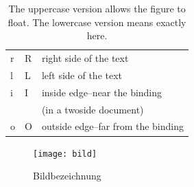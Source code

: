 \blindtext[3]


\begin{table}
	\begin{center}
		\begin{tabular}{|l|l|l|}
			\hline
			r & R & right side of the text\\
			l & L & left side of the text\\
			i & I & inside edge–near the binding\\
			& &  (in a twoside document)\\
			o & O & outside edge–far from the binding\\
			\hline
		\end{tabular}
	\end{center}
	\caption{The uppercase version allows the figure to float. The lowercase version means exactly here.}%
\end{table}

\blindtext[3]

\begin{figure}
	\texttt{[image: bild]}
	\caption{Bildbezeichnung}
	\label{fig:bild}
\end{figure}

\blindtext[3]